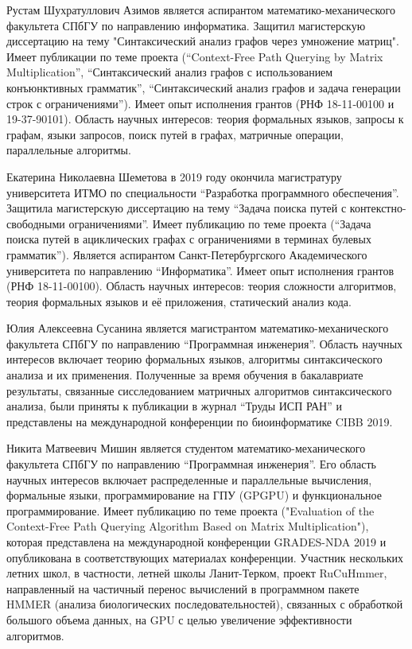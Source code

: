\documentclass[12pt]{article}  %
\theoremstyle{remark}
\begin{document}
Рустам Шухратуллович Азимов является аспирантом математико-механического факультета СПбГУ по направлению информатика.
Защитил магистерскую диссертацию на тему "Синтаксический анализ графов через умножение матриц".
Имеет публикации по теме проекта (``Context-Free Path Querying by Matrix Multiplication'', ``Синтаксический анализ графов с использованием конъюнктивных грамматик'', ``Синтаксический анализ графов и задача генерации строк с ограничениями'').
Имеет опыт исполнения грантов (РНФ 18-11-00100 и 19-37-90101). 
Область научных интересов: теория формальных языков, запросы к графам, языки запросов, поиск путей в графах, матричные операции, параллельные алгоритмы.

Екатерина Николаевна Шеметова в 2019 году окончила магистратуру университета ИТМО по специальности ``Разработка программного обеспечения''. 
Защитила магистерскую диссертацию на тему ``Задача поиска путей с контекстно-свободными ограничениями''. 
Имеет публикацию по теме проекта (``Задача поиска путей в ациклических графах с ограничениями в терминах булевых грамматик''). 
Является аспирантом Санкт-Петербургского Академического университета по направлению ``Информатика''. Имеет опыт исполнения грантов (РНФ 18-11-00100).
Область научных интересов: теория сложности алгоритмов, теория формальных языков и её приложения, статический анализ кода.

Юлия Алексеевна Сусанина является магистрантом математико-механического факультета СПбГУ по направлению “Программная инженерия”.
Область научных интересов включает теорию формальных языков, алгоритмы синтаксического анализа и их применения. 
Полученные за время обучения в бакалавриате результаты, связанные сисследованием матричных алгоритмов синтаксического анализа, были приняты к публикации в журнал “Труды ИСП РАН” и представлены на международной конференции по биоинформатике CIBB 2019.

Никита Матвеевич Мишин является студентом математико-механического факультета СПбГУ  по направлению “Программная инженерия”.
Его область научных интересов включает распределенные и параллельные вычисления, формальные языки, программирование на ГПУ (GPGPU) и функциональное программирование.
Имеет публикацию по теме проекта ("Evaluation of the Context-Free Path Querying Algorithm Based on Matrix Multiplication"),
 которая представлена на международной конференции GRADES-NDA 2019 и опубликована в соответствующих материалах конференции.
Участник нескольких летних школ, в частности, летней школы Ланит-Терком, проект RuCuHmmer,
направленный на частичный перенос вычислений в программном пакете HMMER (анализа биологических последовательностей),
связанных с обработкой большого объема данных, на GPU с целью увеличение эффективности алгоритмов.
\end{document}
